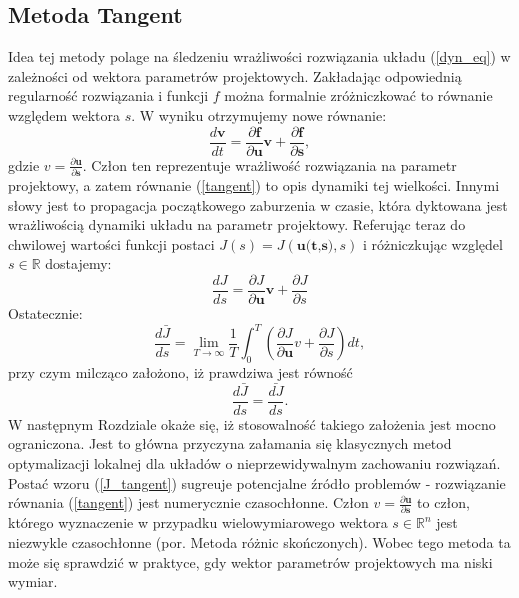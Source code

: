 \documentclass[12pt]{article}
\begin{document}
\subsection{Metoda Tangent}
Idea tej metody polage na śledzeniu wrażliwości rozwiązania układu (\ref{dyn_eq}) w zależności od wektora parametrów projektowych. Zakładając odpowiednią regularność rozwiązania i funkcji $ f $ można formalnie zróżniczkować to równanie względem wektora $ s $. W wyniku otrzymujemy nowe równanie:
\begin{equation}
\frac{d{\textbf{v}}}{d{t}} = \frac{\partial{\textbf{f}}}{\partial{\textbf{u}}}\textbf{v} + \frac{\partial{\textbf{f}}}{\partial{\textbf{s}}}
\label{tangent},
\end{equation}
gdzie $ v = \frac{\partial{\textbf{u}}}{\partial{\textbf{s}}} $. Człon ten reprezentuje wrażliwość rozwiązania na parametr projektowy, a zatem równanie (\ref{tangent}) to opis dynamiki tej wielkości. Innymi słowy jest to propagacja początkowego zaburzenia w czasie, która dyktowana jest wrażliwością dynamiki układu na parametr projektowy. Referując teraz do chwilowej wartości funkcji postaci $ J(s) = J(\textbf{u(t,s)},s) $ i różniczkując względel $ s \in \mathbb{R} $ dostajemy:
\begin{equation}
\frac{dJ}{ds} = \frac{\partial{J}}{\partial{\textbf{u}}}\textbf{v} + \frac{\partial{J}}{\partial{s}}
\end{equation} 
Ostatecznie:
\begin{equation}
\frac{d\bar{J}}{ds} = \lim\limits_{T \rightarrow \infty}\frac{1}{T}\int_{0}^{T}(\frac{\partial{J}}{\partial{\textbf{u}}}v + \frac{\partial{J}}{\partial{s}})dt,
\label{J_tangent}
\end{equation}
przy czym milcząco założono, iż prawdziwa jest równość 
\begin{equation}
\frac{d\bar{J}}{ds} = \bar{\frac{dJ}{ds}}.
\label{djbar_bardj}
\end{equation}
W następnym Rozdziale okaże się, iż stosowalność takiego założenia jest mocno ograniczona. Jest to główna przyczyna załamania się klasycznych metod optymalizacji lokalnej dla układów o nieprzewidywalnym zachowaniu rozwiązań. \newline
Postać wzoru (\ref{J_tangent}) sugreuje potencjalne źródło problemów - rozwiązanie równania (\ref{tangent}) jest numerycznie czasochłonne. Człon $ v = \frac{\partial{\textbf{u}}}{\partial{\textbf{s}}} $ to człon, którego wyznaczenie w przypadku wielowymiarowego wektora $ s \in \mathbb{R}^n $ jest niezwykle czasochłonne (por. Metoda różnic skończonych). Wobec tego metoda ta może się sprawdzić w praktyce, gdy wektor parametrów projektowych ma niski wymiar.
\end{document}
